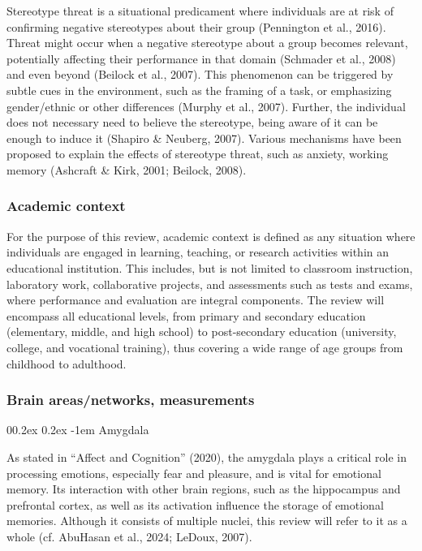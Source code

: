 \documentclass[
  stu, a4paper,floatsintext]{apa7}
\makeatletter
\let\oldparagraph\paragraph
\renewcommand{\paragraph}[1]{\oldparagraph{#1}\mbox{}}
\renewcommand{\paragraph}{\@startsection{paragraph}{4}{\parindent}%
  {0\baselineskip \@plus 0.2ex \@minus 0.2ex}%
  {-1em}%
  {\normalfont\normalsize\bfseries\itshape\typesectitle}}
\renewcommand{\paragraph}{\@startsection{paragraph}{4}{\parindent}%
  {0\baselineskip \@plus 0.2ex \@minus 0.2ex}%
  {-1em}%
  {\normalfont\normalsize\bfseries\typesectitle}}
\makeatother
\begin{document}
Stereotype threat is a situational predicament where individuals are at risk of confirming negative stereotypes about their group (Pennington et al., 2016).
Threat might occur when a negative stereotype about a group becomes relevant, potentially affecting their performance in that domain (Schmader et al., 2008) and even beyond (Beilock et al., 2007).
This phenomenon can be triggered by subtle cues in the environment, such as the framing of a task, or emphasizing gender/ethnic or other differences (Murphy et al., 2007).
Further, the individual does not necessary need to believe the stereotype, being aware of it can be enough to induce it (Shapiro \& Neuberg, 2007).
Various mechanisms have been proposed to explain the effects of stereotype threat, such as anxiety, working memory (Ashcraft \& Kirk, 2001; Beilock, 2008).

\subsubsection{Academic context}\label{academic-context}

For the purpose of this review, academic context is defined as any situation where individuals are engaged in learning, teaching, or research activities within an educational institution. This includes, but is not limited to classroom instruction, laboratory work, collaborative projects, and assessments such as tests and exams, where performance and evaluation are integral components. The review will encompass all educational levels, from primary and secondary education (elementary, middle, and high school) to post-secondary education (university, college, and vocational training), thus covering a wide range of age groups from childhood to adulthood.

\subsubsection{Brain areas/networks, measurements}\label{brain-areasnetworks-measurements}

\paragraph{Amygdala}\label{amygdala}

As stated in {``Affect and Cognition''} (2020), the amygdala plays a critical role in processing emotions, especially fear and pleasure, and is vital for emotional memory.
Its interaction with other brain regions, such as the hippocampus and prefrontal cortex, as well as its activation influence the storage of emotional memories.
Although it consists of multiple nuclei, this review will refer to it as a whole (cf. AbuHasan et al., 2024; LeDoux, 2007).
\end{document}
